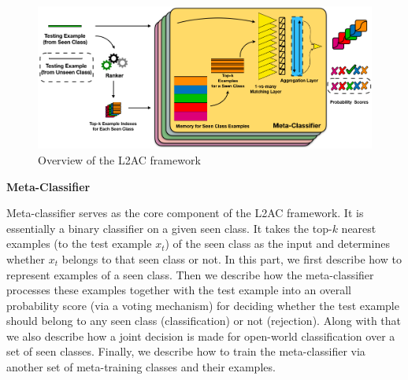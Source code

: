 \begin{figure}
\centering    
\includegraphics[width=5.7in]{fig/www19_overview.png}
\caption{Overview of the L2AC framework}
\label{chap2:fig:overview}
\end{figure}

\textbf{Meta-Classifier}

Meta-classifier serves as the core component of the L2AC framework. It is essentially a binary classifier on a given seen class. It takes the top-$k$ nearest examples (to the test example $x_t$) of the seen class as the input and determines whether $x_t$ belongs to that seen class or not.
In this part, we first describe how to represent examples of a seen class. Then we describe how the meta-classifier processes these examples together with the test example into an overall probability score (via a voting mechanism) for deciding whether the test example should belong to any seen class (classification) or not (rejection). Along with that we also describe how a joint decision is made for open-world classification over a set of seen classes. Finally, we describe how to train the meta-classifier via another set of meta-training classes and their examples.

